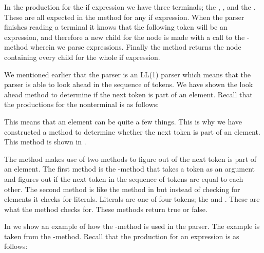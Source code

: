 In the production for the if expression we have three terminals; the , , and the . These are all expected in the method for any if expression. When the parser finishes reading a terminal it knows that the following token will be an expression, and therefore a new child for the node is made with a call to the -method wherein we parse expressions. Finally the method returns the node containing every child for the whole if expression.

We mentioned earlier that the parser is an LL(1) parser which means that the parser is able to look ahead in the sequence of tokens. We have shown the look ahead method to determine if the next token is part of an element. Recall that the productions for the nonterminal is as follows:

\begin{ebnf}
\end{ebnf}

This means that an element can be quite a few things. This is why we have constructed a method to determine whether the next token is part of an element. This method is shown in .



The method  makes use of two methods to figure out of the next token is part of an element. The first method is the -method that takes a token as an argument and figures out if the next token in the sequence of tokens are equal to each other. The second method is like the method in  but instead of checking for elements it checks for literals. Literals are one of four tokens; the  and . These are what the method  checks for. These methods return true or false.

In  we show an example of how the -method is used in the parser. The example is taken from the -method. Recall that the production for an expression is as follows:


